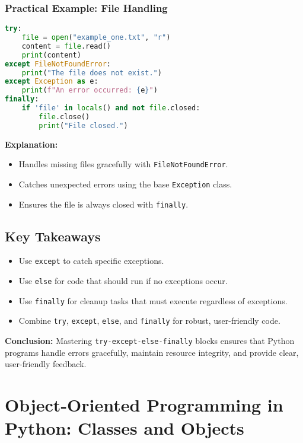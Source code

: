 \subsection{Practical Example: File Handling}

\begin{lstlisting}[language=Python]
try:
    file = open("example_one.txt", "r")
    content = file.read()
    print(content)
except FileNotFoundError:
    print("The file does not exist.")
except Exception as e:
    print(f"An error occurred: {e}")
finally:
    if 'file' in locals() and not file.closed:
        file.close()
        print("File closed.")
\end{lstlisting}

\textbf{Explanation:}  
\begin{itemize}
    \item Handles missing files gracefully with \texttt{FileNotFoundError}.
    \item Catches unexpected errors using the base \texttt{Exception} class.
    \item Ensures the file is always closed with \texttt{finally}.
\end{itemize}

\section{Key Takeaways}

\begin{itemize}
    \item Use \texttt{except} to catch specific exceptions.
    \item Use \texttt{else} for code that should run if no exceptions occur.
    \item Use \texttt{finally} for cleanup tasks that must execute regardless of exceptions.
    \item Combine \texttt{try}, \texttt{except}, \texttt{else}, and \texttt{finally} for robust, user-friendly code.
\end{itemize}

\textbf{Conclusion:}  
Mastering \texttt{try-except-else-finally} blocks ensures that Python programs handle errors gracefully, maintain resource integrity, and provide clear, user-friendly feedback.

\chapter{Object-Oriented Programming in Python: Classes and Objects}

